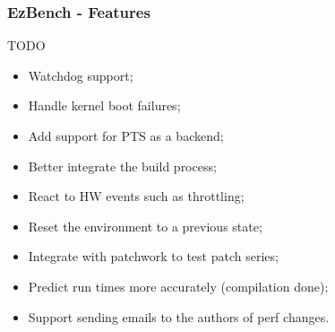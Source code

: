 \documentclass[11pt,english,compress]{beamer}
\begin{document}
\begin{frame}
	\frametitle{EzBench - Features}

	\begin{block}{TODO}
		\begin{itemize}
			\item Watchdog support;\pause
			\item Handle kernel boot failures;\pause
			\item Add support for PTS as a backend;\pause
			\item Better integrate the build process;\pause
			\item React to HW events such as throttling;\pause
			\item Reset the environment to a previous state;\pause
			\item Integrate with patchwork to test patch series;\pause
			\item Predict run times more accurately (compilation done);\pause
			\item Support sending emails to the authors of perf changes.
		\end{itemize}
	\end{block}
\end{frame}
\end{document}
